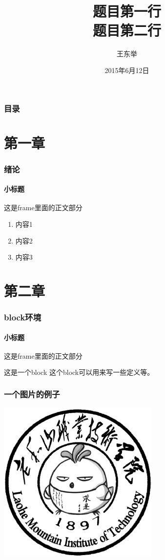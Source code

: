 \documentclass{beamer}
\title{题目第一行\\题目第二行}
\author[WANG]{王东举}
\date{2015年6月12日}
\begin{document}
\begin{frame}
\titlepage
\end{frame}

\begin{frame}
\frametitle{目录}
\tableofcontents

\end{frame}


\section{第一章}

\begin{frame}
\frametitle{绪论}
\framesubtitle{小标题}
这是frame里面的正文部分
\begin{enumerate}
	\item{}内容1
	\item{}内容2
	\item{}内容3
\end{enumerate}
\end{frame}
	
\section{第二章}
\begin{frame}
	\frametitle{block环境}
	\framesubtitle{小标题}
	这是frame里面的正文部分
	\begin{block}{这是一个block}
		这个block可以用来写一些定义等。
	\end{block}
\end{frame}

\begin{frame}
	\frametitle{一个图片的例子}	
	\includegraphics[width = 0.6\textwidth]{../Pictures/LHS.eps}
\end{frame}
\end{document}

